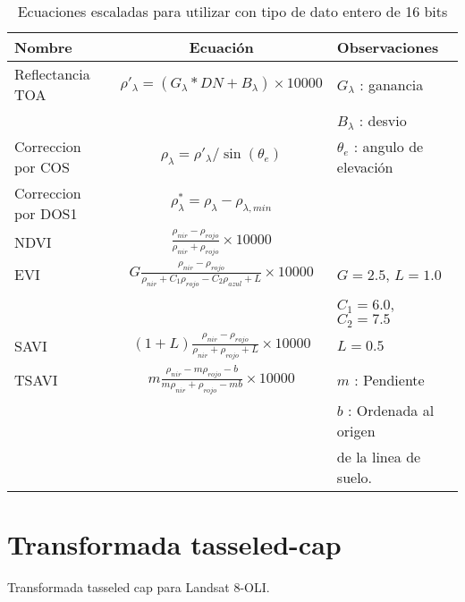 \documentclass[hidelinks,12pt]{article}
\begin{document}
\begin{table}[hbt]
    \centering
    \begin{tabular}{lcl}
        \toprule
        Nombre & Ecuaci\'on & Observaciones\\
        \midrule
        Reflectancia TOA & $\rho'_\lambda =
        (G_\lambda*DN+B_\lambda)\times10000$ &
        $G_\lambda$ : ganancia\\
        & & $B_\lambda$ : desvio\\
        Correccion por COS & $\rho_\lambda = \rho'_\lambda /
        \sin(\theta_e)$ & $\theta_e$ : angulo de elevaci\'on \\
        Correccion por DOS1 & $\rho^*_\lambda = \rho_\lambda -
        \rho_{\lambda,min}$ & \\
        NDVI & $\frac{\rho_{nir} -
    \rho_{rojo}}{\rho_{nir}+\rho_{rojo}}\times10000$ & \\
        EVI & $G\frac{\rho_{nir} -
    \rho_{rojo}}{\rho_{nir}+C_1\rho_{rojo}-C_2\rho_{azul}+L}\times10000$ &
        $G=2.5$, $L=1.0$ \\
        & & $C_1=6.0$, $C_2 = 7.5$\\
        SAVI & $(1+L)\frac{\rho_{nir} -
    \rho_{rojo}}{\rho_{nir}+\rho_{rojo}+L}\times10000$ & $L = 0.5$\\
        TSAVI & $m\frac{\rho_{nir} -
        m\rho_{rojo}-b}{m\rho_{nir}+\rho_{rojo}-mb}\times10000$ & $m$ :
        Pendiente \\
        & & $b$ : Ordenada al origen\\
        & & de la linea de suelo.\\
        \bottomrule
    \end{tabular}
    \caption{Ecuaciones escaladas para utilizar con tipo de dato entero de 16
    bits}
\end{table}

\section{Transformada tasseled-cap}
Transformada tasseled cap para Landsat 8-OLI.
\end{document}
